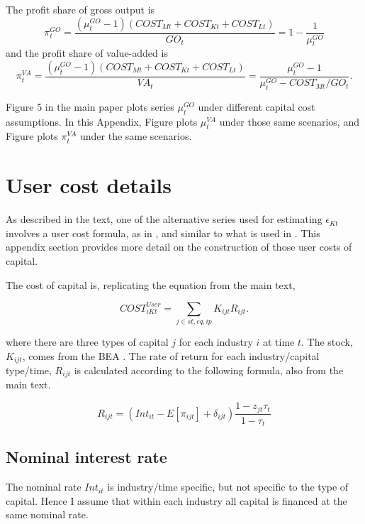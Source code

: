 \documentclass[11pt]{article}
\begin{document}
The profit share of gross output is
\begin{equation}
	\pi^{GO}_t = \frac{(\mu^{GO}_t - 1)(COST_{Mt} + COST_{Kt} + COST_{Lt})}{GO_t} = 1 - \frac{1}{\mu^{GO}_t}
\end{equation}
and the profit share of value-added is
\begin{equation}
	\pi^{VA}_t = \frac{(\mu^{GO}_t - 1)(COST_{Mt} + COST_{Kt} + COST_{Lt})}{VA_t} = \frac{\mu^{GO}_t-1}{\mu^{GO}_t - COST_{Mt}/GO_t}.
\end{equation}

Figure 5 in the main paper plots series $\mu_t^{GO}$ under different capital cost assumptions. In this Appendix, Figure plots $\mu_t^{VA}$ under those same scenarios, and Figure plots $\pi^{VA}_t$ under the same scenarios. 

\section{User cost details}
As described in the text, one of the alternative series used for estimating $\epsilon_{Kt}$ involves a user cost formula, as in \cite{halljorg1967}, and similar to what is used in \cite{Barkai000,rognlie2015}. This appendix section provides more detail on the construction of those user costs of capital. 

The cost of capital is, replicating the equation from the main text,

\begin{equation}
	COST^{User}_{iKt} = \sum_{j \in st,eq,ip} K_{ijt} R_{ijt}.
\end{equation}

where there are three types of capital $j$ for each industry $i$ at time $t$. The stock, $K_{ijt}$, comes from the BEA \citep{beacap,beagov}. The rate of return for each industry/capital type/time, $R_{ijt}$ is calculated according to the following formula, also from the main text.

\begin{equation}
	R_{ijt} = (Int_{it} - E[\pi_{ijt}] + \delta_{ijt})\frac{1-z_{jt} \tau_t}{1-\tau_t}
\end{equation}

\subsection{Nominal interest rate}
The nominal rate $Int_{it}$ is industry/time specific, but not specific to the type of capital. Hence I assume that within each industry all capital is financed at the same nominal rate.
\end{document}
